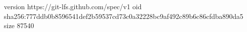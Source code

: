 version https://git-lfs.github.com/spec/v1
oid sha256:777ddb0b8596541def2b59537cd73c0a32228bc9af492c89b6c86cfdba890da5
size 87540
